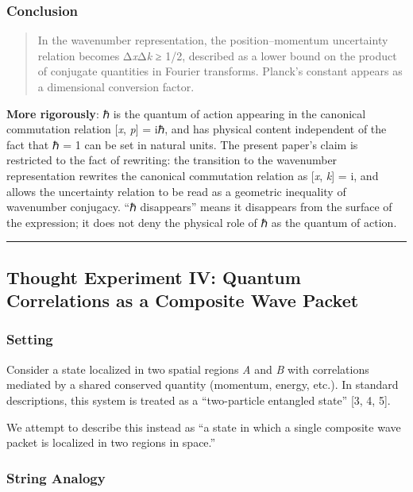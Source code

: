 \documentclass[
  11pt,
]{article}
\begin{document}
\subsubsection{Conclusion}\label{conclusion-2}

\begin{quote}
In the wavenumber representation, the position--momentum uncertainty
relation becomes Δ\emph{x}Δ\emph{k} ≥ 1/2, described as a lower bound on
the product of conjugate quantities in Fourier transforms. Planck's
constant appears as a dimensional conversion factor.
\end{quote}

\textbf{More rigorously}: ℏ is the quantum of action appearing in the
canonical commutation relation {[}\emph{x}, \emph{p}{]} = iℏ, and has
physical content independent of the fact that ℏ = 1 can be set in
natural units. The present paper's claim is restricted to the fact of
rewriting: the transition to the wavenumber representation rewrites the
canonical commutation relation as {[}\emph{x}, \emph{k}{]} = i, and
allows the uncertainty relation to be read as a geometric inequality of
wavenumber conjugacy. ``ℏ disappears'' means it disappears from the
surface of the expression; it does not deny the physical role of ℏ as
the quantum of action.

\begin{center}\rule{0.5\linewidth}{0.5pt}\end{center}

\subsection{Thought Experiment IV: Quantum Correlations as a Composite
Wave
Packet}\label{thought-experiment-iv-quantum-correlations-as-a-composite-wave-packet}

\subsubsection{Setting}\label{setting-3}

Consider a state localized in two spatial regions \emph{A} and \emph{B}
with correlations mediated by a shared conserved quantity (momentum,
energy, etc.). In standard descriptions, this system is treated as a
``two-particle entangled state'' {[}3, 4, 5{]}.

We attempt to describe this instead as ``a state in which a single
composite wave packet is localized in two regions in space.''

\subsubsection{String Analogy}\label{string-analogy}
\end{document}
